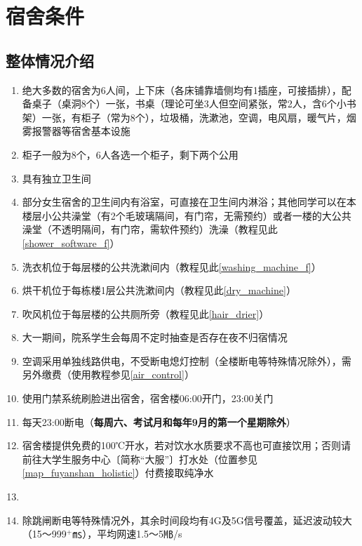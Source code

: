 \section[宿舍条件]{宿舍条件}

\subsection[整体情况介绍]{整体情况介绍}
\begin{enumerate}
    \item 绝大多数的宿舍为6人间，上下床（各床铺靠墙侧均有1插座，可接插排），配备桌子（桌洞8个）一张，书桌（理论可坐3人但空间紧张，常2人，含6个小书架）一张，有柜子（常为8个），垃圾桶，洗漱池，空调，电风扇，暖气片，烟雾报警器等宿舍基本设施
    \item 柜子\footnotemark 一般为8个，6人各选一个柜子，剩下两个公用
    \item 具有独立卫生间
    \item 部分女生宿舍的卫生间内有浴室，可直接在卫生间内淋浴；其他同学可以在本楼层小公共澡堂（有2个毛玻璃隔间，有门帘，无需预约）或者一楼的大公共澡堂（不透明隔间，有门帘，需软件预约）洗澡（教程见此\uline{\ref{shower_software_f}}）
    \item 洗衣机位于每层楼的公共洗漱间内（教程见此\uline{\ref{washing_machine_f}}）
    \item 烘干机位于每栋楼1层公共洗漱间内（教程见此\uline{\ref{dry_machine}}）
    \item 吹风机位于每层楼的公共厕所旁（教程见此\uline{\ref{hair_drier}}）
    \item 大一期间，院系学生会每周不定时抽查是否存在夜不归宿情况
    \item 空调采用单独线路供电，不受断电熄灯控制（全楼断电等特殊情况除外），需另外缴费（使用教程参见\uline{\ref{air_control}}）
    \item 使用门禁系统刷脸进出宿舍，宿舍楼06:00开门，23:00关门
    \item 每天23:00断电（\textbf{每周六、考试月和每年9月的第一个星期除外}）
    \item 宿舍楼提供免费的100℃开水\footnotemark，若对饮水水质要求不高也可直接饮用；否则请前往大学生服务中心〔简称“大服”〕打水处（位置参见\uline{\ref{map_fuyanshan_holistic}}）付费接取纯净水
    \item \textbf{}
    \item 除跳闸断电等特殊情况外，其余时间段均有4G及5G信号覆盖，延迟波动较大（15～999$^+$㎳），平均网速1.5～5㎆/s
\end{enumerate}

